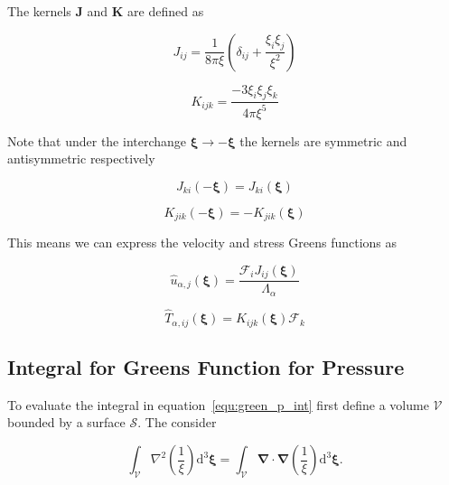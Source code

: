 \documentclass[12pt]{article}
\begin{document}
The kernels $\boldsymbol{J}$ and $\boldsymbol{K}$ are defined as

\begin{equation}
\label{equ:j_kernel}
J_{ij} = \frac{1}{8 \pi \xi} \left(\delta_{ij} + \frac{\xi_{i} \xi_{j}}{\xi^{2}} \right)
\end{equation}

\begin{equation}
\label{equ:k_kernel}
K_{ijk} = \frac{-3 \xi_{i} \xi_{j} \xi_{k}}{4 \pi \xi^{5}}
\end{equation}

Note that under the interchange $\boldsymbol\xi \to -\boldsymbol\xi$ the kernels are symmetric and antisymmetric respectively

\begin{equation}
\label{equ:j_sym}
J_{ki}(-\boldsymbol\xi) = J_{ki}(\boldsymbol\xi)
\end{equation}

\begin{equation}
\label{equ:k_sym}
K_{jik}(-\boldsymbol\xi) = -K_{jik}(\boldsymbol\xi)
\end{equation}

This means we can express the velocity and stress Greens functions as

\begin{equation}
\label{equ:u_green}
\hat{u}_{\alpha,j}(\boldsymbol\xi) = \frac{\mathcal{F}_{i} J_{ij} (\boldsymbol\xi)}{\Lambda_{\alpha}}
\end{equation}

\begin{equation}
\label{equ:stress_green}
\hat{T}_{\alpha, ij}(\boldsymbol\xi) = K_{ijk} (\boldsymbol\xi) \mathcal{F}_{k}
\end{equation}

\subsection{Integral for Greens Function for Pressure}
\label{sub_app:green_p}

To evaluate the integral in equation~\ref{equ:green_p_int} first define a volume $\mathcal{V}$ bounded by a surface $\mathcal{S}$. The consider

\begin{equation}
\label{equ:int_del_recip}
\int_{\mathcal{V}} \nabla^{2} \left(\frac{1}{\xi}\right) \mathrm{d} ^{3} \boldsymbol{\xi} = \int_{\mathcal{V}} \boldsymbol{\nabla} \cdot \boldsymbol{\nabla} \left(\frac{1}{\xi}\right) \mathrm{d} ^{3} \boldsymbol{\xi} .
\end{equation}
\end{document}
